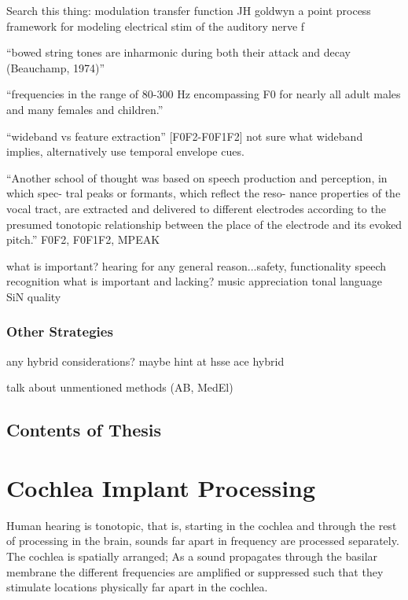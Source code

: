 \documentclass [11pt, proquest] {uwthesis}[2015/03/03]
\begin{document}
Search this thing:
modulation transfer function
JH goldwyn
a point process framework for modeling electrical stim of the auditory nerve
f

``bowed string tones are inharmonic during both their attack and decay (Beauchamp, 1974)''

``frequencies in the range of 80-300 Hz encompassing F0 for nearly all adult males and many females and children.''


``wideband vs feature extraction'' [F0F2-F0F1F2]
not sure what wideband implies, alternatively use temporal envelope cues.

``Another school of thought was based on speech production and perception, in which spec- tral peaks or formants, which reflect the reso- nance properties of the vocal tract, are extracted and delivered to different electrodes according to the presumed tonotopic relationship between the place of the electrode and its evoked pitch.'' %
F0F2, F0F1F2, MPEAK

    what is important?
        hearing for any general reason...safety, functionality
        speech recognition
    what is important and lacking?
        music appreciation
        tonal language
        SiN
        quality

\subsection{Other Strategies}

any hybrid considerations?  maybe hint at hsse ace hybrid

talk about unmentioned methods (AB, MedEl)


\section{Contents of Thesis}


\chapter{Cochlea Implant Processing}

Human hearing is tonotopic, that is, starting in the cochlea and through the rest of processing in the brain, sounds far apart in frequency are processed separately.  The cochlea is spatially arranged; As a sound propagates through the basilar membrane the different frequencies are amplified or suppressed such that they stimulate locations physically far apart in the cochlea.
\end{document}
